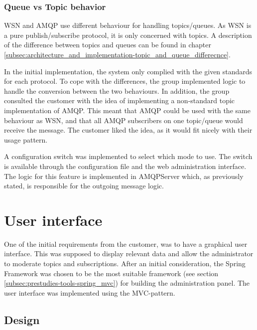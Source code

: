 \subsubsection{Queue vs Topic behavior}
WSN and AMQP use different behaviour for handling topics/queues. As WSN is a pure publish/subscribe protocol, it is only concerned with topics. A description of the difference between topics and queues can be found in chapter \ref{subsec:architecture_and_implementation-topic_and_queue_differecnce}.

In the initial implementation, the system only complied with the given standards for each protocol. To cope with the differences, the group implemented logic to handle the conversion between the two behaviours. In addition, the group consulted the customer with the idea of implementing a non-standard topic implementation of AMQP. This meant that AMQP could be used with the same behaviour as WSN, and that all AMQP subscribers on one topic/queue would receive the message. The customer liked the idea, as it would fit nicely with their usage pattern. 

A configuration switch was implemented to select which mode to use. The switch is available through the configuration file and the web administration interface. The logic for this feature is implemented in AMQPServer which, as previously stated, is responsible for the outgoing message logic.


\section{User interface}
\label{sec:architecture_and_implementation-user_interface}

One of the initial requirements from the customer, was to have a graphical user interface. This was supposed to display relevant data and allow the administrator to moderate topics and subscriptions. After an initial consideration, the Spring Framework was chosen to be the most suitable framework (see section  \ref{subsec:prestudies-tools-spring_mvc}) for building the administration panel. The user interface was implemented using the MVC-pattern. 

\subsection{Design}
\label{subsec:architecture_and_implementation-user_interface-design}

